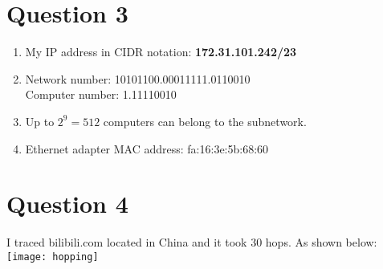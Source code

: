 \documentclass[12pt,letterpaper]{article}
\begin{document}
\section*{Question 3}
\begin{enumerate}
	\item My IP address in CIDR notation: \textbf{172.31.101.242/23}
	\item Network number: 10101100.00011111.0110010 \\
			Computer number: 1.11110010
	\item Up to $2^{9}=512$ computers can belong to the subnetwork.
	\item Ethernet adapter MAC address: fa:16:3e:5b:68:60	
\end{enumerate}


\section*{Question 4}
I traced bilibili.com located in China and it took 30 hops. As shown below: \\

\texttt{[image: hopping]}
\end{document}
